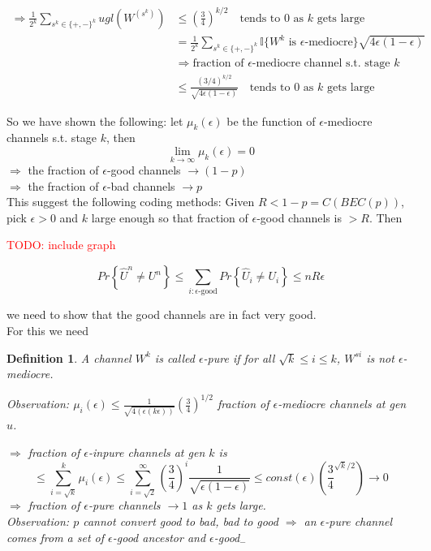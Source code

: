 \documentclass[twoside]{article}
\newtheorem{definition}{Definition}[section]
\theoremstyle{definition} %
\newcommand{\todo}[1]{\textcolor{red}{TODO: #1}}
\renewcommand{\Pr}[1]{Pr\left\{#1\right\}}
\def\I{\mathbb{I}}
\begin{document}
\begin{align*}
  \Rightarrow \frac{1}{2^k} \sum_{s^k \in \{+, -\}^k} ugl(W^{(s^k)}) &\leq (\frac{3}{4})^{k/2} \quad \text{tends to 0 as } k \text{ gets large} \\
  &= \frac{1}{2^k} \sum_{s^k \in \{+, -\}^k} \I\{W^k \text{ is } \epsilon \text{-mediocre}\} \sqrt{4 \epsilon(1 - \epsilon)} \\
  & \Rightarrow \text{fraction of } \epsilon \text{-mediocre channel s.t. stage } k \\
  & \leq \frac{(3/4)^{k/2}}{\sqrt{4 \epsilon (1 - \epsilon)}}  \quad \text{tends to 0 as } k \text{ gets large}
\end{align*}

So we have shown the following: let $\mu_k(\epsilon)$ be the function of $\epsilon$-mediocre channels s.t. stage $k$, then
\[
  \lim_{k \to \infty} \mu_k(\epsilon) = 0
\]
$\Rightarrow$ the fraction of $\epsilon$-good channels $\rightarrow (1-p)$\\
$\Rightarrow$ the fraction of $\epsilon$-bad channels $\rightarrow p$ \\

This suggest the following coding methods: Given $R < 1 - p = C(BEC(p))$, pick $\epsilon > 0$ and $k$ large enough so that fraction of $\epsilon$-good channels is $>R$. Then

\todo{include graph}

\[
  \Pr{\hat{U}^n \neq U^n} \leq \sum_{i: \epsilon\text{-good}} \Pr{\hat{U}_i \neq U_i} \leq nR \epsilon
\]

we need to show that the good channels are in fact very good.\\

For this we need

\begin{definition}
  A channel $W^k$ is called $\epsilon$-pure if for all $\sqrt{k} \leq i \leq k$, $W^{si}$ is not $\epsilon$-mediocre.

  \textit{Observation:} $\mu_i(\epsilon) \leq \frac{1}{\sqrt{4(\epsilon(k \epsilon))}}(\frac{3}{4})^{1/2}$ fraction of $\epsilon$-mediocre channels at gen $u$.

  $\Rightarrow$ fraction of $\epsilon$-inpure channels at gen $k$ is
  \[
    \leq \sum_{i = \sqrt{k}}^k \mu_i(\epsilon) \leq \sum_{i = \sqrt{2}}^{\infty} (\frac{3}{4})^i \frac{1}{\sqrt{\epsilon(1 - \epsilon)}} \leq const (\epsilon)(\frac{3}{4}^{\sqrt{k}/2}) \rightarrow 0
  \]
  $\Rightarrow$ fraction of $\epsilon$-pure channels $\rightarrow 1$ as $k$ gets large.\\

  \textit{Observation:} $p$ cannot convert good to bad, bad to good $\Rightarrow$ an $\epsilon$-pure channel comes from a set of $\epsilon$-good ancestor and $\epsilon$-good$_-$
\end{definition}
\end{document}
